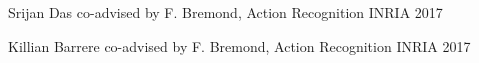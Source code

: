 



\begin{cvhonors}

  \cvhonor
    {Srijan Das} %
    {co-advised by F. Bremond, Action Recognition} %
    {INRIA} %
    {2017} %

  \cvhonor
    {Killian Barrere} %
    {co-advised by F. Bremond, Action Recognition} %
    {INRIA} %
    {2017} %


\end{cvhonors}
